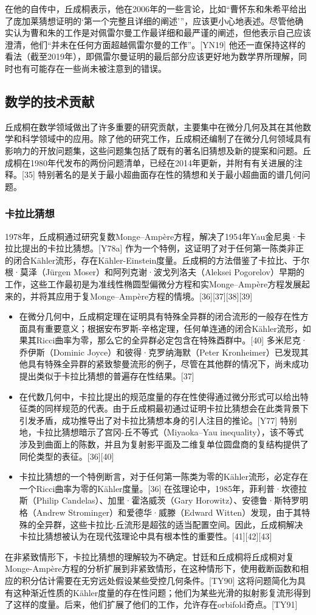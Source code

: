 在他的自传中，丘成桐表示，他在2006年的一些言论，比如“曹怀东和朱希平给出了庞加莱猜想证明的‘第一个完整且详细的阐述’”，应该更小心地表述。尽管他确实认为曹和朱的工作是对佩雷尔曼工作最详细和最严谨的阐述，但他表示自己应该澄清，他们“并未在任何方面超越佩雷尔曼的工作”。[YN19] 他还一直保持这样的看法（截至2019年），即佩雷尔曼证明的最后部分应该更好地为数学界所理解，同时也有可能存在一些尚未被注意到的错误。
\subsection{数学的技术贡献}
丘成桐在数学领域做出了许多重要的研究贡献，主要集中在微分几何及其在其他数学和科学领域中的应用。除了他的研究工作，丘成桐还编制了在微分几何领域具有影响力的开放问题集，这些问题集包括了既有的著名旧猜想及新的提案和问题。丘成桐在1980年代发布的两份问题清单，已经在2014年更新，并附有有关进展的注释。[35] 特别著名的是关于最小超曲面存在性的猜想和关于最小超曲面的谱几何问题。
\subsubsection{卡拉比猜想}
1978年，丘成桐通过研究复数Monge–Ampère方程，解决了1954年Yau金尼奥·卡拉比提出的卡拉比猜想。[Y78a] 作为一个特例，这证明了对于任何第一陈类非正的闭合Kähler流形，存在Kähler-Einstein度量。丘成桐的方法借鉴了卡拉比、于尔根·莫泽（Jürgen Moser）和阿列克谢·波戈列洛夫（Aleksei Pogorelov）早期的工作，这些工作最初是为准线性椭圆型偏微分方程和实Monge–Ampère方程发展起来的，并将其应用于复Monge–Ampère方程的情境。[36][37][38][39]
\begin{itemize}
\item 在微分几何中，丘成桐定理在证明具有特殊全异群的闭合流形的一般存在性方面具有重要意义；根据安布罗斯-辛格定理，任何单连通的闭合Kähler流形，如果其Ricci曲率为零，那么它的全异群必定包含在特殊酉群中。[40] 多米尼克·乔伊斯（Dominic Joyce）和彼得·克罗纳海默（Peter Kronheimer）已发现其他具有特殊全异群的紧致黎曼流形的例子，尽管在其他群的情况下，尚未成功提出类似于卡拉比猜想的普遍存在性结果。[37]  
\item 在代数几何中，卡拉比提出的规范度量的存在性使得通过微分形式可以给出特征类的同样规范的代表。由于丘成桐最初通过证明卡拉比猜想会在此类背景下引发矛盾，成功推导出了对卡拉比猜想本身的引人注目的推论。[Y77] 特别地，卡拉比猜想暗示了宫冈-丘不等式（Miyaoka–Yau inequality），该不等式涉及到曲面上的陈数，并且为复射影平面及二维复单位圆盘商的复结构提供了同伦类型的表征。[36][40]  
\item 卡拉比猜想的一个特例断言，对于任何第一陈类为零的Kähler流形，必定存在一个Ricci曲率为零的Kähler度量。[36] 在弦理论中，1985年，菲利普·坎德拉斯（Philip Candelas）、加里·霍洛威茨（Gary Horowitz）、安德鲁·斯特罗明格（Andrew Strominger）和爱德华·威滕（Edward Witten）发现，由于其特殊的全异群，这些卡拉比-丘流形是超弦的适当配置空间。因此，丘成桐解决卡拉比猜想被认为在现代弦理论中具有根本性的重要性。[41][42][43]
\end{itemize}
在非紧致情形下，卡拉比猜想的理解较为不确定。甘廷和丘成桐将丘成桐对复Monge-Ampère方程的分析扩展到非紧致情形，在这种情形下，使用截断函数和相应的积分估计需要在无穷远处假设某些受控几何条件。[TY90] 这将问题简化为具有这种渐近性质的Kähler度量的存在性问题；他们为某些光滑的拟射影复流形得到了这样的度量。后来，他们扩展了他们的工作，允许存在orbifold奇点。[TY91]  

